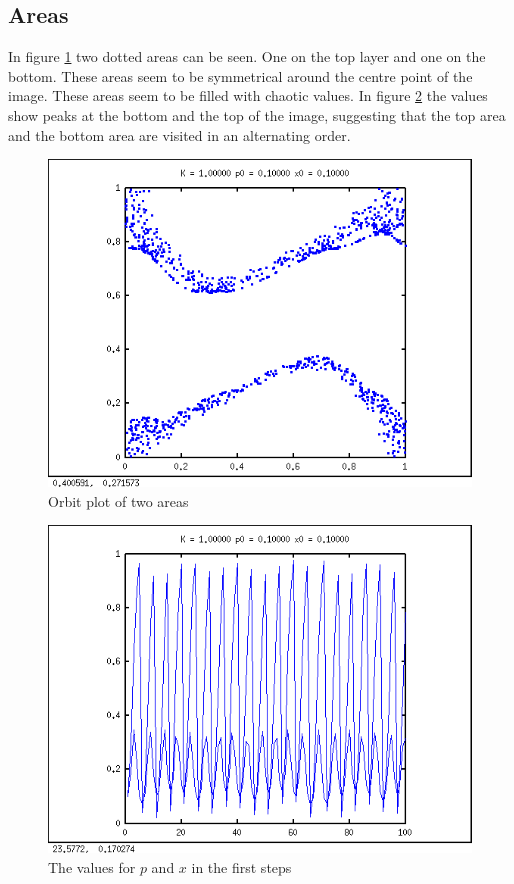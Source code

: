 \documentclass{article}
\begin{document}
\subsection*{Areas}
In figure \ref{areaorbit} two dotted areas can be seen. One on the top layer and one on the bottom. These areas seem to be symmetrical around the centre point of the image. These areas seem to be filled with chaotic values. In figure \ref{areaval} the values show peaks at the bottom and the top of the image, suggesting that the top area and the bottom area are visited in an alternating order.

\begin{figure}[H]
\centering
\includegraphics[width=.8\textwidth]{areaorbit.png}
\caption{Orbit plot of two areas}
\label{areaorbit}
\end{figure}

\newpage
\begin{figure}[H]
\centering
\includegraphics[width=.8\textwidth]{areavalues.png}
\caption{The values for $p$ and $x$ in the first steps }
\label{areaval}
\end{figure}
\end{document}
